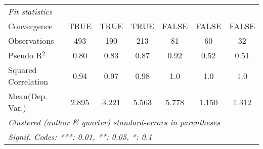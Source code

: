 \begin{tabular}{lcccccc}
   \midrule
   \emph{Fit statistics}\\
   Convergence                                                &TRUE         & TRUE    & TRUE         & FALSE          & FALSE       & FALSE\\  
   Observations                                               & 493         & 190     & 213          & 81             & 60          & 32\\  
   Pseudo R$^2$                                               & 0.80        & 0.83    & 0.87         & 0.92           & 0.52        & 0.51\\  
   Squared Correlation                                        & 0.94        & 0.97    & 0.98         & 1.0            & 1.0         & 1.0\\  
Mean(Dep. Var.) & 2.895 & 3.221 & 5.563 & 5.778 & 1.150 & 1.312 \\
   \midrule \midrule
   \multicolumn{7}{l}{\emph{Clustered (author \& quarter) standard-errors in parentheses}}\\
   \multicolumn{7}{l}{\emph{Signif. Codes: ***: 0.01, **: 0.05, *: 0.1}}\\
\end{tabular}
\par\endgroup
